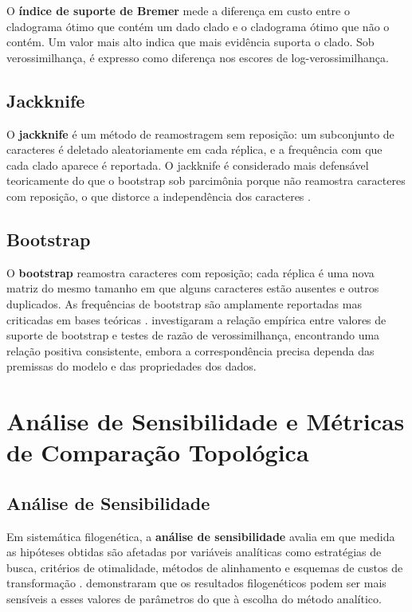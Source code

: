 O \textbf{índice de suporte de Bremer} \parencite{bremer1988} mede a diferença em custo entre o cladograma ótimo que contém um dado clado e o cladograma ótimo que não o contém. Um valor mais alto indica que mais evidência suporta o clado. Sob verossimilhança, é expresso como diferença nos escores de log-verossimilhança.

\subsection{Jackknife}

O \textbf{jackknife} \parencite{farrisetal1996} é um método de reamostragem sem reposição: um subconjunto de caracteres é deletado aleatoriamente em cada réplica, e a frequência com que cada clado aparece é reportada. O jackknife é considerado mais defensável teoricamente do que o bootstrap sob parcimônia porque não reamostra caracteres com reposição, o que distorce a independência dos caracteres \parencite{farrisetal1996}.

\subsection{Bootstrap}

O \textbf{bootstrap} \parencite{felsenstein1985} reamostra caracteres com reposição; cada réplica é uma nova matriz do mesmo tamanho em que alguns caracteres estão ausentes e outros duplicados. As frequências de bootstrap são amplamente reportadas mas criticadas em bases teóricas \parencite{farrisetal1996}. \textcite{jacobmachado2021d} investigaram a relação empírica entre valores de suporte de bootstrap e testes de razão de verossimilhança, encontrando uma relação positiva consistente, embora a correspondência precisa dependa das premissas do modelo e das propriedades dos dados.

\section{Análise de Sensibilidade e Métricas de Comparação Topológica}
\label{sec:metricas}

\subsection{Análise de Sensibilidade}

Em sistemática filogenética, a \textbf{análise de sensibilidade} avalia em que medida as hipóteses obtidas são afetadas por variáveis analíticas como estratégias de busca, critérios de otimalidade, métodos de alinhamento e esquemas de custos de transformação \parencite{machado2015,wheeler1995}. \textcite{morrisonellis1997} demonstraram que os resultados filogenéticos podem ser mais sensíveis a esses valores de parâmetros do que à escolha do método analítico.

